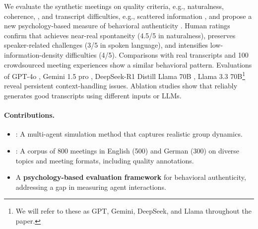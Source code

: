 We evaluate the synthetic meetings on quality criteria, e.g., naturalness, coherence, \cite{ChenPTK23}, and transcript difficulties, e.g., scattered information \cite{KirsteinWRG24a}, and propose a new psychology-based measure of behavioral authenticity \cite{ChoiAVQ20}.
Human ratings confirm that \dataset{} achieves near-real spontaneity (4.5/5  in naturalness), preserves speaker-related challenges (3/5 in spoken language), and intensifies low-information-density difficulties (4/5).
Comparisons with real transcripts and 100 crowdsourced meeting experiences show a similar behavioral pattern.
Evaluations of GPT-4o \cite{OpenAIAAA24}, Gemini 1.5 pro \cite{GeminiTeamRST24}, DeepSeek-R1 Distill Llama 70B \cite{DeepSeekAIGYZ25a}, Llama 3.3 70B\footnote{We will refer to these as GPT, Gemini, DeepSeek, and Llama throughout the paper.} \cite{GrattafioriDJP24} reveal persistent context-handling issues. 
Ablation studies show that \pipeline{} reliably generates good transcripts using different inputs or LLMs.

\paragraph{Contributions.}
\begin{itemize}[noitemsep, topsep=0pt, leftmargin=*]
    \item \textbf{\pipeline{}}: A multi-agent simulation method that captures realistic group dynamics.
    \item \textbf{\dataset{}}: A corpus of 800 meetings in English (500) and German (300) on diverse topics and meeting formats, including quality annotations.
    \item A \textbf{psychology-based evaluation framework} for behavioral authenticity, addressing a gap in measuring agent interactions. 
\end{itemize}